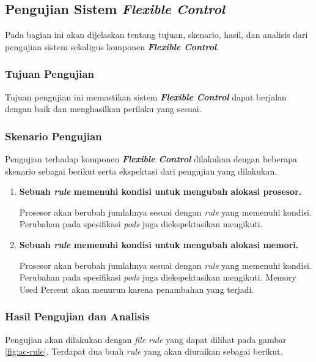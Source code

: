 \subsection{Pengujian Sistem \textit{Flexible Control}}

Pada bagian ini akan dijelaskan tentang tujuan, skenario, hasil, dan analisis dari pengujian sistem sekaligus komponen \textbf{\textit{Flexible Control}}.

\subsubsection{Tujuan Pengujian}

Tujuan pengujian ini memastikan sistem \textbf{\textit{Flexible Control}} dapat berjalan dengan baik dan menghasilkan perilaku yang sesuai.

\subsubsection{Skenario Pengujian}

Pengujian terhadap komponen \textbf{\textit{Flexible Control}} dilakukan dengan beberapa skenario sebagai berikut serta ekspektasi dari pengujian yang dilakukan.
\begin{enumerate}
    \item \bfseries Sebuah \textit{rule} memenuhi kondisi untuk mengubah alokasi prosesor.\normalfont
    
    Prosesor akan berubah jumlahnya sesuai dengan \textit{rule} yang memenuhi kondisi. Perubahan pada spesifikasi \textit{pods} juga diekspektasikan mengikuti.

    \item \bfseries Sebuah \textit{rule} memenuhi kondisi untuk mengubah alokasi memori.\normalfont
    
    Prosesor akan berubah jumlahnya sesuai dengan \textit{rule} yang memenuhi kondisi. Perubahan pada spesifikasi \textit{pods} juga diekspektasikan mengikuti. Memory Used Percent akan menurun karena penambahan yang terjadi.
\end{enumerate}

\subsubsection{Hasil Pengujian dan Analisis}

Pengujian akan dilakukan dengan \textit{file rule} yang dapat dilihat pada gambar \ref{fig:ac-rule}. Terdapat dua buah \textit{rule} yang akan diuraikan sebagai berikut.

